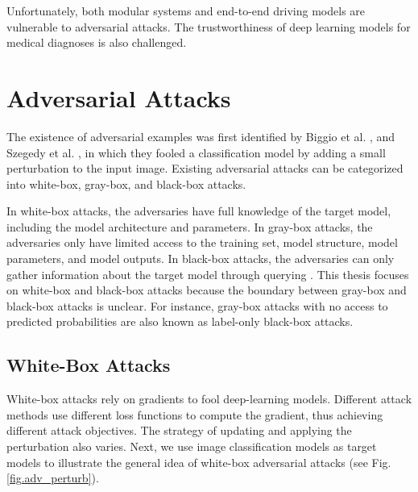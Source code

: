 Unfortunately, both modular systems and end-to-end driving models are vulnerable to adversarial attacks. The trustworthiness of deep learning models for medical diagnoses is also challenged.


\section{Adversarial Attacks}
\label{sec:adv_attack}

The existence of adversarial examples was first identified by Biggio et al. \citep{biggio2013evasion}, and Szegedy et al. \citep{szegedy2013intriguing}, in which they fooled a classification model by adding a small perturbation to the input image. Existing adversarial attacks can be categorized into white-box, gray-box, and black-box attacks. 

In white-box attacks, the adversaries have full knowledge of the target model, including the model architecture and parameters. In gray-box attacks, the adversaries only have limited access to the training set, model structure, model parameters, and model outputs. In black-box attacks, the adversaries can only gather information about the target model through querying \citep{REN2020346}. This thesis focuses on white-box and black-box attacks because the boundary between gray-box and black-box attacks is unclear. For instance, gray-box attacks with no access to predicted probabilities are also known as label-only black-box attacks.


\subsection{White-Box Attacks}
\label{sec:whitebox_attack}

White-box attacks rely on gradients to fool deep-learning models. Different attack methods use different loss functions to compute the gradient, thus achieving different attack objectives. The strategy of updating and applying the perturbation also varies. Next, we use image classification models as target models to illustrate the general idea of white-box adversarial attacks (see Fig. \ref{fig.adv_perturb}).

